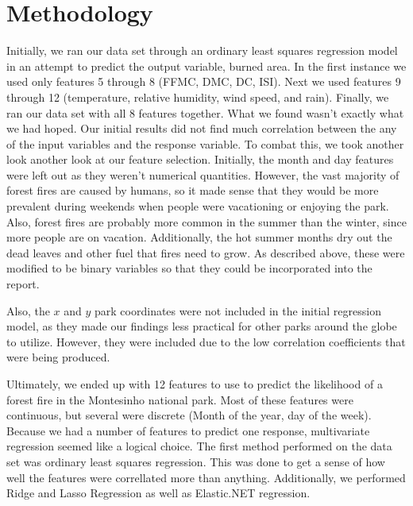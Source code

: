 \documentclass{article}
\begin{document}
\section{Methodology}

Initially, we ran our data set through an ordinary least squares regression model in an attempt to predict the output variable, burned area.  In the first instance we used only features 5 through 8 (FFMC, DMC, DC, ISI).  Next we used features 9 through 12 (temperature, relative humidity, wind speed, and rain).  Finally, we ran our data set with all 8 features together.  What we found wasn't exactly what we had hoped.  Our initial results did not find much correlation between the any of the input variables and the response variable.  To combat this, we took another look another look at our feature selection.  Initially, the month and day features were left out as they weren't numerical quantities.  However, the vast majority of forest fires are caused by humans, so it made sense that they would be more prevalent during weekends when people were vacationing or enjoying the park.  Also, forest fires are probably more common in the summer than the winter, since more people are on vacation.  Additionally, the hot summer months dry out the dead leaves and other fuel that fires need to grow.  As described above, these were modified to be binary variables so that they could be incorporated into the report.  

Also, the $x$ and $y$ park coordinates were not included in the initial regression model, as they made our findings less practical for other parks around the globe to utilize.  However, they were included due to the low correlation coefficients that were being produced.  

Ultimately, we ended up with 12 features to use to predict the likelihood of a forest fire in the Montesinho national park.  Most of these features were continuous, but several were discrete (Month of the year, day of the week).  Because we had a number of features to predict one response, multivariate regression seemed like a logical choice.  The first method performed on the data set was ordinary least squares regression.  This was done to get a sense of how well the features were correllated more than anything.  Additionally, we performed Ridge and Lasso Regression as well as Elastic.NET regression.  \\ \\ \\ \\ \\
\end{document}
